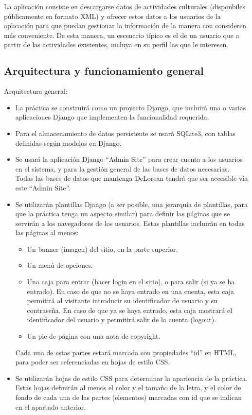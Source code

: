 La aplicación consiste en descargarse datos de actividades culturales (disponbiles públicamente en formato XML) y ofrecer estos datos a los usuarios de la aplicación para que puedan gestionar la información de la manera con consideren más conveniente. De esta manera, un escenario típico es el de un usuario que a partir de las actividades existentes, incluya en su perfil las que le interesen.

\subsection{Arquitectura y funcionamiento general}

Arquitectura general:

\begin{itemize}

\item La práctica se construirá como un proyecto Django, que incluirá una o varias aplicaciones Django que implementen la funcionalidad requerida.

\item Para el almacenamiento de datos persistente se usará SQLite3, con tablas definidas según modelos en Django.

\item Se usará la aplicación Django ``Admin Site'' para crear cuenta a los usuarios en el sistema, y para la gestión general de las bases de datos necesarias. Todas las bases de datos que mantenga DeLorean tendrá que ser accesible vía este ``Admin Site''.

\item Se utilizarán plantillas Django (a ser posible, una jerarquía de plantillas, para que la práctica tenga un aspecto similar) para definir las páginas que se servirán a los navegadores de los usuarios. Estas plantillas incluirán en todas las páginas al menos:
  \begin{itemize}
  \item Un banner (imagen) del sitio, en la parte superior.
  \item Un menú de opciones.
  \item Una caja para entrar (hacer login en el sitio), o para salir (si ya se ha entrado). En caso de que no se haya entrado en una cuenta, esta caja permitirá al visitante introducir su identificador de usuario y su contraseña. En caso de que ya se haya entrado, esta caja mostrará el identificador del usuario y permitirá salir de la cuenta (logout).
  \item Un pie de página con una nota de copyright.
  \end{itemize}

Cada una de estas partes estará marcada con propiedades ``id'' en HTML, para poder ser referenciadas en hojas de estilo CSS.

\item Se utilizarán hojas de estilo CSS para determinar la apariencia de la práctica. Estas hojas definirán al menos el color y el tamaño de la letra, y el color de fondo de cada una de las partes (elementos) marcadas con id que se indican en el apartado anterior.
\end{itemize}

